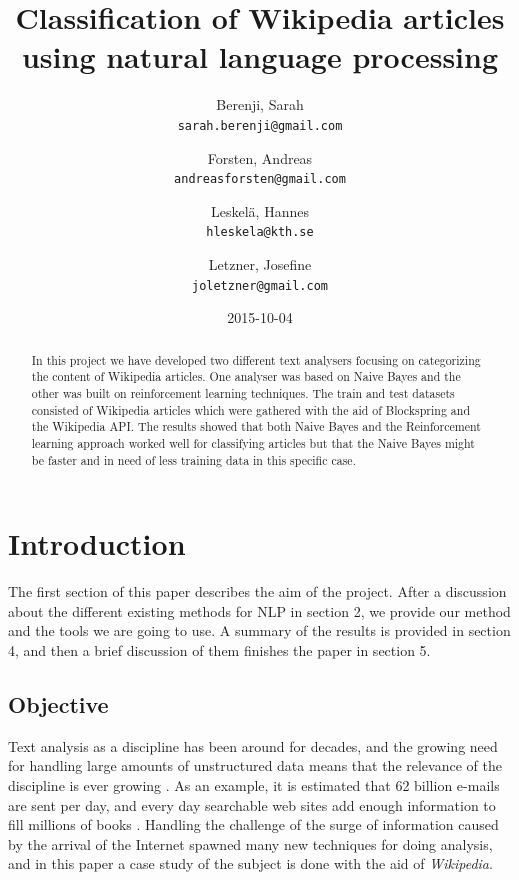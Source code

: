 \documentclass[a4paper]{article}
\title{Classification of Wikipedia articles using natural language processing}
\author{
  Berenji, Sarah\\
  \texttt{sarah.berenji@gmail.com}
  \and
  Forsten, Andreas\\
  \texttt{andreasforsten@gmail.com}
  \and
  Leskelä, Hannes\\
  \texttt{hleskela@kth.se}
  \and
  Letzner, Josefine\\
    \texttt{joletzner@gmail.com}
}
\date{2015-10-04}
\begin{document}
\maketitle
\begin{abstract}

\noindent In this project we have developed two different text analysers focusing on categorizing the content of Wikipedia articles. One analyser was based on Naive Bayes and the other was built on reinforcement learning techniques. The train and test datasets consisted of Wikipedia articles which were gathered with the aid of Blockspring and the Wikipedia API. The results showed that both Naive Bayes and the Reinforcement learning approach worked well for classifying articles but that the Naive Bayes might be faster and in need of less training data in this specific case.
\end{abstract}
\newpage
\tableofcontents
\newpage

\section{Introduction}


\noindent The first section of this paper describes the aim of the project. After a discussion about the different existing methods for NLP in section 2, we provide our method and the tools we are going to use. A summary of the results is provided in section 4, and then a brief discussion of them finishes the paper in section 5.
\vspace{3mm}

\subsection{Objective}
 
Text analysis as a discipline has been around for decades, and the growing need for handling large amounts of unstructured data means that the relevance of the discipline is ever growing \cite{HistoryofTextAnalytics}. As an example, it is estimated that 62 billion e-mails are sent per day, and every day searchable web sites add enough information to fill millions of books \cite{ChallengesInTextAnalytics}. Handling the challenge of the surge of information caused by the arrival of the Internet spawned many new techniques for doing analysis, and in this paper a case study of the subject is done with the aid of \textit{Wikipedia}. 

\vspace{3mm}
\end{document}

